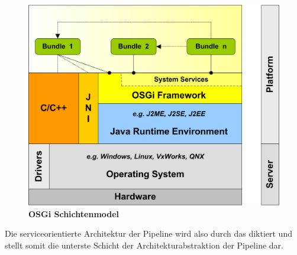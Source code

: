 \begin{figure}[htbp]
	\begin{center}
		\includegraphics[scale=1.3]{pics/osgi_layer.png}
	\caption[OSGi Schichtenmodel]{
	\textbf{OSGi Schichtenmodel}
	}
	\end{center}
	\label{fig:osgi_layer}
\end{figure}

Die serviceorientierte Architektur der Pipeline wird also durch das
 diktiert und stellt somit die unterste Schicht der
Architekturabstraktion der Pipeline dar.

